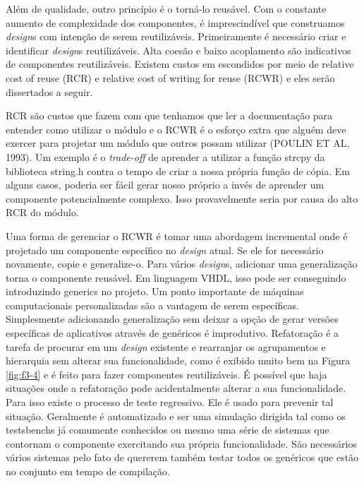 Além de qualidade, outro princípio é o torná-lo reusável. Com o constante aumento de complexidade dos componentes, é imprescindível que construamos \textit{design}s com intenção de serem reutilizáveis. Primeiramente é necessário criar e identificar \textit{design}s reutilizáveis. Alta coesão e baixo acoplamento são indicativos de componentes reutilizáveis. Existem custos em escondidos por meio de relative cost of reuse (RCR) e relative cost of writing for reuse (RCWR) e eles serão dissertados a seguir.

RCR são custos que fazem com que tenhamos que ler a documentação para entender como utilizar o módulo e o RCWR é o esforço extra que alguém deve exercer para projetar um módulo que outros possam utilizar (POULIN ET AL, 1993). Um exemplo é o \textit{trade-off} de aprender a utilizar a função strcpy da biblioteca string.h contra o tempo de criar a nossa própria função de cópia. Em alguns casos, poderia ser fácil gerar nosso próprio a invés de aprender um componente potencialmente complexo. Isso provavelmente seria por causa do alto RCR do módulo.

Uma forma de gerenciar o RCWR é tomar uma abordagem incremental onde é projetado um componente específico no \textit{design} atual. Se ele for necessário novamente, copie e generalize-o. Para vários \textit{design}s, adicionar uma generalização torna o componente reusável. Em linguagem VHDL, isso pode ser conseguindo introduzindo generics no projeto. Um ponto importante de máquinas computacionais personalizadas são a vantagem de serem específicas. Simplesmente adicionando generalização sem deixar a opção de gerar versões específicas de aplicativos através de genéricos é improdutivo. Refatoração é a tarefa de procurar em um \textit{design} existente e rearranjar os agrupamentos e hierarquia sem alterar sua funcionalidade, como é exibido muito bem na Figura \ref{fig:f3-4} e é feito para fazer componentes reutilizáveis. É possível que haja situações onde a refatoração pode acidentalmente alterar a sua funcionalidade. Para isso existe o processo de teste regressivo. Ele é usado para prevenir tal situação. Geralmente é automatizado e ser uma simulação dirigida tal como os testsbenchs já comumente conhecidos ou mesmo uma série de sistemas que contornam o componente exercitando sua própria funcionalidade. São necessários vários sistemas pelo fato de quererem também testar todos os genéricos que estão no conjunto em tempo de compilação.





